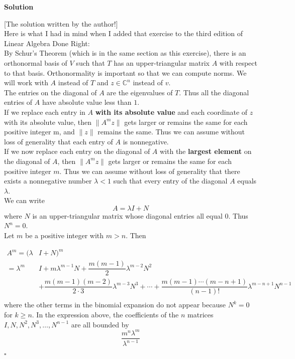 \documentclass{article}
\newenvironment{solution}{%
{
    \textbf{Solution\\}
    }
}{
  \hfill $\square$ 
  \par\bigskip 
}
\newcommand{\CC}{\mathbb{C}}
\begin{document}
\begin{CJK}{UTF8}{gkai}
\begin{solution}
    [The solution written by the author!]\\

    Here is what I had in mind when I added that exercise to the third edition of Linear Algebra Done Right:\\

    By Schur's Theorem (which is in the same section as this exercise), there is an orthonormal basis of $V$ such that $T$ has an upper-triangular matrix $A$ with respect to that basis. Orthonormality is important so that we can compute norms. We will work with $A$ instead of $T$ and $z\in \CC^n$ instead of $v$.\\
    
    The entries on the diagonal of $A$ are the eigenvalues of $T$. Thus all the diagonal entries of $A$ have absolute value less than $1$.\\
    
    If we replace each entry in $A$ \textbf{with its absolute value} and each coordinate of $z$ with its absolute value, then $\|A^m z\|$ gets larger or remains the same for each positive integer m, and $\|z\|$ remains the same. Thus we can assume without loss of generality that each entry of $A$ is nonnegative.\\
    
    If we now replace each entry on the diagonal of $A$ with the \textbf{largest element} on the diagonal of $A$, then $\|A^m z\|$ gets larger or remains the same for each positive integer $m$. Thus we can assume without loss of generality that there exists a nonnegative number $\lambda <1$ such that every entry of the diagonal $A$ equals $\lambda$.\\
    
    We can write
    \[A=\lambda I+N\]
    where $N$ is an upper-triangular matrix whose diagonal entries all equal $0$. Thus $N^n=0$.\\
    
    Let $m$ be a positive integer with $m > n$. Then
    
    \[\begin{aligned}
        A^m =(\lambda& I+N)^m\\
        =\lambda^m& I+m\lambda^{m-1}N + \dfrac{m(m-1)}{2} \lambda^{m-2} N^2 \\
        &+ \dfrac{m(m-1)(m-2)}{2\cdot 3}\lambda^{m-3} N^3 +\cdots+ \dfrac{m(m-1)\cdots(m-n+1)}{(n-1)!}\lambda^{m-n+1}N^{n-1}\\
    \end{aligned}\]
    where the other terms in the binomial expansion do not appear because $N^k=0$ for $k\geq n$. In the expression above, the coefficients of the $n$ matrices $I, N, N^2, N^3, \ldots, N^{n-1}$ are all bounded by \[\dfrac{m^n\lambda^m}{\lambda^{n-1}}\]


\end{solution}
\end{CJK}
\end{document}
